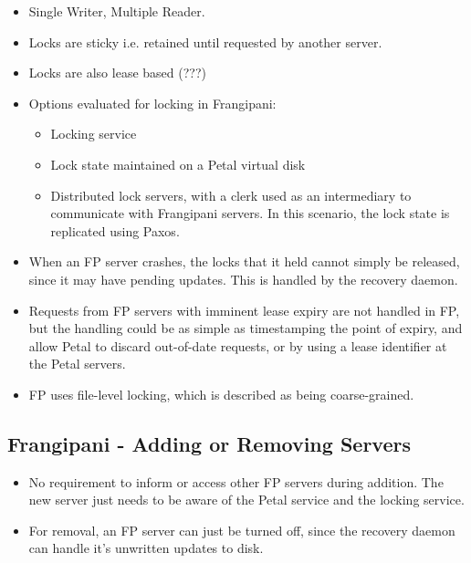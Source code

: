 \documentclass[parskip=half]{scrartcl}
\begin{document}
        \begin{itemize}
            \item 
            Single Writer, Multiple Reader.
            \item 
            Locks are sticky i.e. retained until requested by another server.
            \item 
            Locks are also lease based (???)
            \item 
            Options evaluated for locking in Frangipani:
            \begin{itemize}
                \item 
                Locking service
                \item 
                Lock state maintained on a Petal virtual disk
                \item 
                Distributed lock servers, with a clerk used as an intermediary to communicate with Frangipani servers. In this scenario, the lock state is replicated using Paxos.
            \end{itemize}
            \item 
            When an FP server crashes, the locks that it held cannot simply be released, since it may have pending updates. This is handled by the recovery daemon.
            \item 
            Requests from FP servers with imminent lease expiry are not handled in FP, but the handling could be as simple as timestamping the point of expiry, and allow Petal to discard out-of-date requests, or by using a lease identifier at the Petal servers.
            \item 
            FP uses file-level locking, which is described as being coarse-grained.
        \end{itemize}
    

    \subsection{Frangipani - Adding or Removing Servers} %
    \label{sub:frangipani_adding_or_removing_servers}

        \begin{itemize}
            \item 
            No requirement to inform or access other FP servers during addition. The new server just needs to be aware of the Petal service and the locking service.
            \item 
            For removal, an FP server can just be turned off, since the recovery daemon can handle it's unwritten updates to disk.
        \end{itemize}
    
\end{document}
